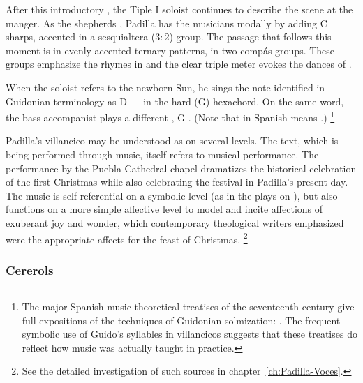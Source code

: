 After this introductory , the Tiple I soloist continues to describe the scene at the manger.
As the shepherds  , Padilla has the musicians  modally by adding C sharps, accented in a sesquialtera ($3:2$) group.
The passage that follows this moment is in evenly accented ternary patterns, in two-compás groups.
These groups emphasize the rhymes in  and the clear triple meter evokes the dances of .

When the soloist refers to the newborn Sun, he sings the note identified in Guidonian terminology as D --- in the hard (G) hexachord.
On the same word, the bass accompanist plays a different , G . 
(Note that  in Spanish means .)%
	\footnote{%
The major Spanish music-theoretical treatises of the seventeenth century give full expositions of the techniques of Guidonian solmization: \autocites{Cerone:Melopeo}{Lorente:Porque}.
The frequent symbolic use of Guido's syllables in villancicos suggests that these treatises do reflect how music was actually taught in practice.
	}

%
Padilla's villancico may be understood as  on several levels.
The text, which is being performed through music, itself refers to musical performance.
The performance by the Puebla Cathedral chapel dramatizes the historical celebration of the first Christmas while also celebrating the festival in Padilla's present day.
The music is self-referential on a symbolic level (as in the plays on ), but also functions on a more simple affective level to model and incite affections of exuberant joy and wonder, which contemporary theological writers emphasized were the appropriate affects for the feast of Christmas.%
	\footnote{%
	See the detailed investigation of such sources in chapter~\ref{ch:Padilla-Voces}.
	}

\subsubsection{Cererols}

